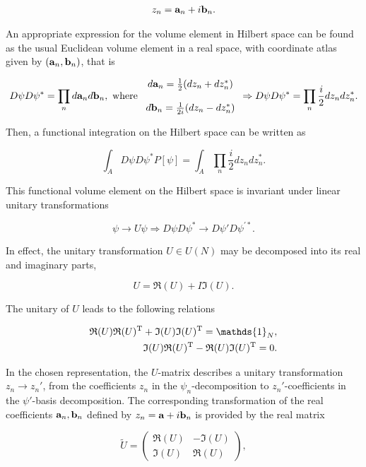 \documentclass{homework}
\begin{document}
\begin{align*}
    z_n = {\bf a}_n + i{\bf b}_n.
\end{align*}

An appropriate expression for the volume element in Hilbert space can be found as the usual Euclidean volume element in a real space, with coordinate atlas given by $({\bf a}_n,{\bf b}_n)$, that is 

$$
    D\psi D\psi^* = \prod_{n} d{\bf a}_n d{\bf b}_n, \textnormal{ where } \begin{array}{c}
        d{\bf a}_n = \frac{1}{2} (dz_n + dz_n^*)  \\
        \\
        d{\bf b}_n = \frac{1}{2i} (dz_n - dz_n^*)  
    \end{array} \Rightarrow D\psi D\psi^* = \prod_{n} \frac{i}{2} dz_n dz_n^*.
$$

Then, a functional integration on the Hilbert space can be written as 

$$
    \int_{A} D\psi D\psi^* P[\psi] = \int_{A} \prod_{n} \frac{i}{2} dz_n dz_n^*.
$$

This functional volume element on the Hilbert space is invariant under linear unitary transformations 

$$
    \psi \rightarrow U \psi \Rightarrow D\psi D\psi^*  \rightarrow D\psi' D\psi^{'*}. 
$$

In effect, the unitary transformation $U \in U(N)$ may be decomposed into its real and imaginary parts, 

$$
    U = \mathfrak{R}(U) + I \mathfrak{I}(U).
$$

The unitary of $U$ leads to the following relations 

\begin{align}
    \mathfrak{R}(U) \mathfrak{R}(U)^{\textnormal{T}} + \mathfrak{I}(U)\mathfrak{I}(U)^{\textnormal{T}} = \mathds{1}_N, \\
    \mathfrak{I}(U) \mathfrak{R}(U)^{\textnormal{T}} - \mathfrak{R}(U)\mathfrak{I}(U)^{\textnormal{T}} = 0.
\end{align}

In the chosen representation, the $U$-matrix describes a unitary transformation $z_n \rightarrow z_n'$, from the coefficients $z_n$ in the $\psi_n$-decomposition to $z_n'$-coefficients in the $\psi'$-basis decomposition. The corresponding transformation of the real coefficients ${\bf a}_n, {\bf b}_n$ defined by $z_n = {\bf a} + i {\bf b}_n$ is provided by the real matrix 

$$
    \tilde{U} = \left( \begin{array}{cc}
        \mathfrak{R}(U)  & - \mathfrak{I}(U)  \\
        \mathfrak{I}(U)  &  \mathfrak{R}(U) 
    \end{array}
    \right),
$$
\end{document}
